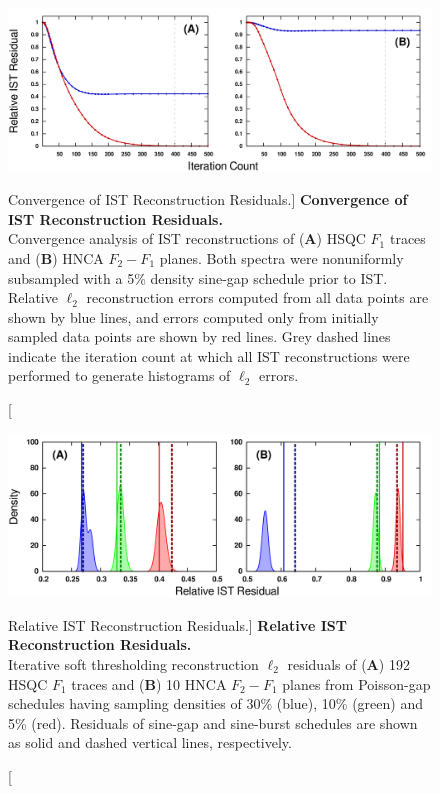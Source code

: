 \begin{figure}[ht!]
\includegraphics[width=6in]{figs/dgs/08-converge.png}
\caption
      [Convergence of IST Reconstruction Residuals.]{
  {\bf Convergence of IST Reconstruction Residuals.}
  \\
  Convergence analysis of IST reconstructions of ({\bf A}) \hnnmr{} HSQC $F_1$
  traces and ({\bf B}) HNCA $F_2-F_1$ planes. Both spectra were nonuniformly
  subsampled with a 5\% density sine-gap schedule prior to IST. Relative
  $\ell_2$ reconstruction errors computed from all data points are shown by
  blue lines, and errors computed only from initially sampled data points are
  shown by red lines. Grey dashed lines indicate the iteration count at which
  all IST reconstructions were performed to generate histograms of $\ell_2$
  errors.
}
\label{figure.2.8}
\end{figure}

\begin{figure}[ht!]
\includegraphics[width=6in]{figs/dgs/09-residuals.png}
\caption
      [Relative IST Reconstruction Residuals.]{
  {\bf Relative IST Reconstruction Residuals.}
  \\
  Iterative soft thresholding reconstruction $\ell_2$ residuals of ({\bf A})
  192 \hnnmr{} HSQC $F_1$ traces and ({\bf B}) 10 HNCA $F_2-F_1$ planes from
  Poisson-gap schedules having sampling densities of 30\% (blue), 10\% (green)
  and 5\% (red). Residuals of sine-gap and sine-burst schedules are shown as
  solid and dashed vertical lines, respectively.
}
\label{figure.2.9}
\end{figure}

